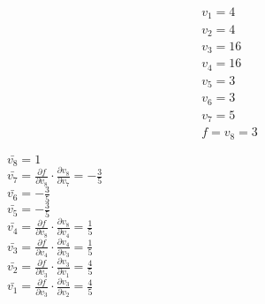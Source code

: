 \documentclass[../mn-notatki.tex]{subfiles}
\begin{document}
\begin{minipage}{.5\textwidth}
    \begin{gather*}
        v_1 = 4\\
        v_2 = 4\\
        v_3 = 16\\
        v_4 = 16\\
        v_5 = 3\\
        v_6 = 3\\
        v_7 = 5\\
        f = v_8 = 3
    \end{gather*}
\end{minipage}%
\begin{minipage}{.5\textwidth}
        $\bar{v_8} = 1$\\
        $\bar{v_7} = \frac{\partial f}{\partial v_8} \cdot \frac{\partial v_8}{\partial v_7} = -\frac{3}{5}$\\
        $\bar{v_6} = -\frac{3}{5}$\\
        $\bar{v_5} = -\frac{3}{5}$\\
        $\bar{v_4} = \frac{\partial f}{\partial v_8} \cdot \frac{\partial v_8}{\partial v_4} = \frac{1}{5}$\\
        $\bar{v_3} = \frac{\partial f}{\partial v_4} \cdot \frac{\partial v_4}{\partial v_3} = \frac{1}{5}$\\
        $\bar{v_2} = \frac{\partial f}{\partial v_3} \cdot \frac{\partial v_3}{\partial v_1} = \frac{4}{5}$\\
        $\bar{v_1} = \frac{\partial f}{\partial v_3} \cdot \frac{\partial v_3}{\partial v_2} = \frac{4}{5}$
\end{minipage}

\end{document}

